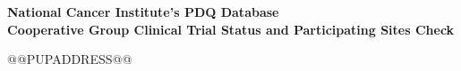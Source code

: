 \documentclass[letterpaper,12pt]{article}
\begin{document}


\begin{center}\bfseries\large
    National Cancer Institute's PDQ Database \\
    Cooperative Group Clinical Trial Status and Participating Sites Check
\end{center}

@@PUPADDRESS@@

\StatusIntro

\StatusDefinition

\vfill
\end{document}

